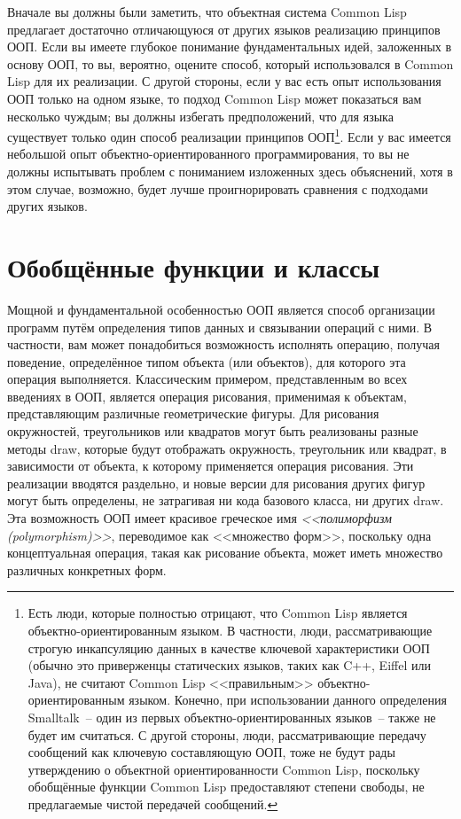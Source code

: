 Вначале вы должны были заметить, что объектная система Common Lisp предлагает достаточно
отличающуюся от других языков реализацию принципов ООП. Если вы имеете глубокое понимание
фундаментальных идей, заложенных в основу ООП, то вы, вероятно, оцените способ, который
использовался в Common Lisp для их реализации.  С другой стороны, если у вас есть опыт
использования ООП только на одном языке, то подход Common Lisp может показаться вам
несколько чуждым; вы должны избегать предположений, что для языка существует только один
способ реализации принципов ООП\footnote{Есть люди, которые полностью отрицают, что Common
  Lisp является объектно-ориентированным языком.  В частности, люди, рассматривающие
  строгую инкапсуляцию данных в качестве ключевой характеристики ООП (обычно это
  приверженцы статических языков, таких как C++, Eiffel или Java), не считают Common Lisp
  <<правильным>> объектно-ориентированным языком.  Конечно, при использовании данного
  определения Smalltalk~-- один из первых объектно-ориентированных языков~-- также не будет
  им считаться.  С другой стороны, люди, рассматривающие передачу сообщений как ключевую
  составляющую ООП, тоже не будут рады утверждению о объектной ориентированности Common
  Lisp, поскольку обобщённые функции Common Lisp предоставляют степени свободы, не
  предлагаемые чистой передачей сообщений.}.  Если у вас имеется небольшой опыт
объектно-ориентированного программирования, то вы не должны испытывать проблем с
пониманием изложенных здесь объяснений, хотя в этом случае, возможно, будет лучше
проигнорировать сравнения с подходами других языков.

\section{Обобщённые функции и классы}

Мощной и фундаментальной особенностью ООП является способ организации программ путём
определения типов данных и связывании операций с ними.  В частности, вам может
понадобиться возможность исполнять операцию, получая поведение, определённое типом объекта
(или объектов), для которого эта операция выполняется. Классическим примером, представленным
во всех введениях в ООП, является операция рисования, применимая к объектам,
представляющим различные геометрические фигуры.  Для рисования окружностей, треугольников
или квадратов могут быть реализованы разные методы draw, которые будут отображать
окружность, треугольник или квадрат, в зависимости от объекта, к которому применяется
операция рисования. Эти реализации вводятся раздельно, и новые версии для рисования других
фигур могут быть определены, не затрагивая ни кода базового класса, ни других draw.  Эта
возможность ООП имеет красивое греческое имя \textit{<<полиморфизм (polymorphism)>>},
переводимое как <<множество форм>>, поскольку одна концептуальная операция, такая как
рисование объекта, может иметь множество различных конкретных форм.

